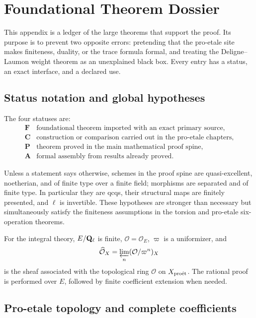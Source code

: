 \chapter{Foundational Theorem Dossier}
\label{app:proetale-foundations}

This appendix is a ledger of the large theorems that support the proof.  Its
purpose is to prevent two opposite errors: pretending that the pro-etale site
makes finiteness, duality, or the trace formula formal, and treating the
Deligne--Laumon weight theorem as an unexplained black box.  Every entry has a
status, an exact interface, and a declared use.

\section{Status notation and global hypotheses}

The four statuses are:
\[
\begin{array}{c|l}
\mathbf F&
 \text{foundational theorem imported with an exact primary source},\\
\mathbf C&
 \text{construction or comparison carried out in the pro-etale chapters},\\
\mathbf P&
 \text{theorem proved in the main mathematical proof spine},\\
\mathbf A&
 \text{formal assembly from results already proved}.
\end{array}
\tag{A.1}\label{eq:dossier-statuses}
\]

Unless a statement says otherwise, schemes in the proof spine are
quasi-excellent, noetherian, and of finite type over a finite field;
morphisms are separated and of finite type.  In particular they are qcqs,
their structural maps are finitely presented, and \(\ell\) is invertible.
These hypotheses are stronger than necessary but simultaneously satisfy the
finiteness assumptions in the torsion and pro-etale six-operation theorems.

For the integral theory, \(E/\mathbf Q_\ell\) is finite,
\(\mathcal O=\mathcal O_E\), \(\varpi\) is a uniformizer, and
\[
 \widehat{\mathcal O}_X
   =\varprojlim_n(\mathcal O/\varpi^n)_X
\]
is the sheaf associated with the topological ring \(\mathcal O\) on
\(X_{\mathrm{pro\acute et}}\).  The rational proof is performed over \(E\), followed by
finite coefficient extension when needed.

\section{Pro-etale topology and complete coefficients}


